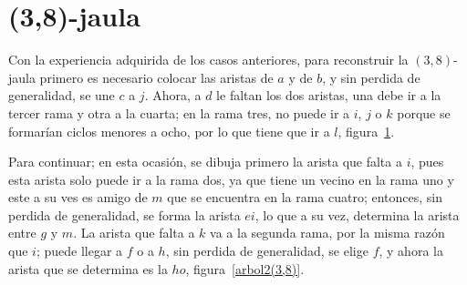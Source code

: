 \documentclass[11pt]{book}
\theoremstyle{definition}
\begin{document}
\section{(3,8)-jaula}

Con la experiencia adquirida de los casos anteriores, para reconstruir
la $(3,8)$-jaula primero es necesario colocar las aristas de $a$ y de
$b$, y sin perdida de generalidad, se une $c$ a $j$. Ahora, a $d$ le
faltan los dos aristas, una debe ir a la tercer rama y otra a la
cuarta; en la rama tres, no puede ir a $i$, $j$ o $k$ porque se
formarían ciclos menores a ocho, por lo que tiene que ir a $l$,
figura~\ref{arbol(3,8)}.

\begin{figure}
  \centering
  \caption{} \label{arbol(3,8)}
\end{figure}

Para continuar; en esta ocasión, se dibuja primero la arista que falta
a $i$, pues esta arista solo puede ir a la rama dos, ya que tiene un
vecino en la rama uno y este a su ves es amigo de $m$ que se encuentra
en la rama cuatro; entonces, sin perdida de generalidad, se forma la
arista $ei$, lo que a su vez, determina la arista entre $g$ y $m$. La
arista que falta a $k$ va a la segunda rama, por la misma razón que
$i$; puede llegar a $f$ o a $h$, sin perdida de generalidad, se elige
$f$, y ahora la arista que se determina es la $ho$,
figura~\ref{arbol2(3,8)}.
\end{document}
